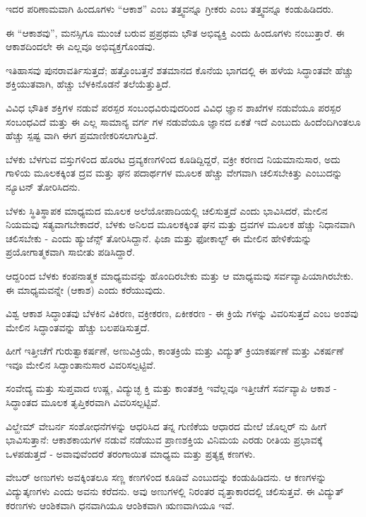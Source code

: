 ಇದರ ಪರಿಣಾಮವಾಗಿ ಹಿಂದೂಗಳು “ಆಕಾಶ” ಎಂಬ ತತ್ತ್ವವನ್ನೂ ಗ್ರೀಕರು  ಎಂಬ ತತ್ತ್ವವನ್ನೂ ಕಂಡುಹಿಡಿದರು.

ಈ “ಆಕಾಶವು”, ಮನಸ್ಸಿಗೂ ಮುಂಚೆ ಬರುವ ಪ್ರಪ್ರಥಮ ಭೌತ ಅಭಿವ್ಯಕ್ತಿ ಎಂದು ಹಿಂದೂಗಳು ನಂಬುತ್ತಾರೆ. ಈ ಆಕಾಶದಿಂದಲೇ ಈ ಎಲ್ಲವೂ ಅಭಿವ್ಯಕ್ತಗೊಂಡವು.

ಇತಿಹಾಸವು ಪುನರಾವರ್ತಿಸುತ್ತದೆ; ಹತ್ತೊಂಬತ್ತನೆ ಶತಮಾನದ ಕೊನೆಯ ಭಾಗದಲ್ಲಿ ಈ ಹಳೆಯ ಸಿದ್ಧಾಂತವೇ ಹೆಚ್ಚು ಶಕ್ತಿಯುತವಾಗಿ, ಹೆಚ್ಚು ಬೆಳಕಿನೊಡನೆ ತಲೆಯೆತ್ತುತ್ತಿದೆ.

ವಿವಿಧ ಭೌತಿಕ ಶಕ್ತಿಗಳ ನಡುವೆ ಪರಸ್ಪರ ಸಂಬಂಧವಿರುವುದರಿಂದ ವಿವಿಧ ಜ್ಞಾನ ಶಾಖೆಗಳ ನಡುವೆಯೂ ಪರಸ್ಪರ ಸಂಬಂಧವಿದೆ ಮತ್ತು ಈ ಎಲ್ಲ ಸಾಮಾನ್ಯ ವರ್ಗ ಗಳ ನಡುವೆಯೂ ಜ್ಞಾನದ ಏಕತೆ ಇದೆ ಎಂಬುದು ಹಿಂದೆಂದಿಗಿಂತಲೂ ಹೆಚ್ಚು ಸ್ಪಷ್ಟ ವಾಗಿ ಈಗ ಪ್ರಮಾಣೀಕರಿಸಲಾಗುತ್ತಿದೆ.

ಬೆಳಕು ಬೆಳಗುವ ವಸ್ತುಗಳಿಂದ ಹೊರಟ ದ್ರವ್ಯಕಣಗಳಿಂದ ಕೂಡಿದ್ದಿದ್ದರೆ, ವಕ್ರೀ ಕರಣದ ನಿಯಮಾನುಸಾರ, ಅದು ಗಾಳಿಯ ಮೂಲಕಕ್ಕಿಂತ ದ್ರವ ಮತ್ತು ಘನ ಪದಾರ್ಥಗಳ ಮೂಲಕ ಹೆಚ್ಚು ವೇಗವಾಗಿ ಚಲಿಸಬೇಕಿತ್ತು ಎಂಬುದನ್ನು ನ್ಯೂಟನ್ ತೋರಿಸಿದನು.

ಬೆಳಕು ಸ್ಥಿತಿಸ್ಥಾಪಕ ಮಾಧ್ಯಮದ ಮೂಲಕ ಅಲೆಯೋಪಾದಿಯಲ್ಲಿ ಚಲಿಸುತ್ತದೆ ಎಂದು ಭಾವಿಸಿದರೆ, ಮೇಲಿನ ನಿಯಮವು ಸತ್ಯವಾಗಬೇಕಾದರೆ, ಬೆಳಕು ಅನಿಲದ ಮೂಲಕಕ್ಕಿಂತ ಘನ ಮತ್ತು ದ್ರವಗಳ ಮೂಲಕ ಹೆಚ್ಚು ನಿಧಾನವಾಗಿ ಚಲಿಸಬೇಕು - ಎಂದು ಹ್ಯುಜೆನ್ಸ್  ತೋರಿಸಿದ್ದಾನೆ. ಫಿಜಾ  ಮತ್ತು ಫೋಕಾಲ್ಟ್  ಈ ಮೇಲಿನ ಹೇಳಿಕೆಯನ್ನು ಪ್ರಯೋಗಾತ್ಮಕವಾಗಿ ಸಾಬೀತು ಪಡಿಸಿದ್ದಾರೆ.

ಆದ್ದರಿಂದ ಬೆಳಕು ಕಂಪನಾತ್ಮಕ ಮಾಧ್ಯಮವನ್ನು ಹೊಂದಿರಬೇಕು ಮತ್ತು ಆ ಮಾಧ್ಯಮವು ಸರ್ವವ್ಯಾಪಿಯಾಗಿರಬೇಕು. ಈ ಮಾಧ್ಯಮವನ್ನೇ  (ಆಕಾಶ) ಎಂದು ಕರೆಯುವುದು.

ವಿಶ್ವ ಆಕಾಶ ಸಿದ್ಧಾಂತವು ಬೆಳಕಿನ ವಿಕಿರಣ, ವಕ್ರೀಕರಣ, ಏಕೀಕರಣ - ಈ ಕ್ರಿಯೆ ಗಳನ್ನು ವಿವರಿಸುತ್ತದೆ ಎಂಬ ಅಂಶವು ಮೇಲಿನ ಸಿದ್ಧಾಂತವನ್ನು ಹೆಚ್ಚು ಬಲಪಡಿಸುತ್ತದೆ.

ಹೀಗೆ ಇತ್ತೀಚೆಗೆ ಗುರುತ್ವಾಕರ್ಷಣೆ, ಅಣುವಿಕ್ರಿಯೆ, ಕಾಂತಕ್ರಿಯೆ ಮತ್ತು ವಿದ್ಯುತ್ ಕ್ರಿಯಾಕರ್ಷಣೆ ಮತ್ತು ವಿಕರ್ಷಣೆ ಇವೂ ಮೇಲಿನ ಸಿದ್ಧಾಂತಾನುಸಾರ ವಿವರಿಸಲ್ಪಟ್ಟಿವೆ.

ಸಂವೇದ್ಯ ಮತ್ತು ಸುಪ್ತವಾದ ಉಷ್ಣ, ವಿದ್ಯುಚ್ಛ ಕ್ತಿ ಮತ್ತು ಕಾಂತಶಕ್ತಿ ಇವೆಲ್ಲವೂ ಇತ್ತೀಚೆಗೆ ಸರ್ವವ್ಯಾಪಿ ಆಕಾಶ - ಸಿದ್ಧಾಂತದ ಮೂಲಕ ತೃಪ್ತಿಕರವಾಗಿ ವಿವರಿಸಲ್ಪಟ್ಟಿವೆ.

ವಿಲ್ಹೇಮ್​ ವೇಬರ್ನ ಸಂಶೋಧನೆಗಳನ್ನು ಆಧರಿಸಿದ ತನ್ನ ಗುಣಿಕೆಯ ಆಧಾರದ ಮೇಲೆ ಜೊಲ್ನರ್  ನು ಹೀಗೆ ಭಾವಿಸುತ್ತಾನೆ: ಆಕಾಶಕಾಯಗಳ ನಡುವೆ ನಡೆಯುವ ಪ್ರಾಣಶಕ್ತಿಯ ವಿನಿಮಯ ಎರಡು ರೀತಿಯ ಪ್ರಭಾವಕ್ಕೆ ಒಳಪಡುತ್ತದೆ - ಅವಾವುವೆಂದರೆ ತರಂಗಾಯಿತ ಮಾಧ್ಯಮ ಮತ್ತು ಪ್ರತ್ಯಕ್ಷ ಕಣಗಳು.

ವೇಬರ್ ಅಣುಗಳು  ಅವಕ್ಕಿಂತಲೂ ಸಣ್ಣ ಕಣಗಳಿಂದ ಕೂಡಿವೆ ಎಂಬುದನ್ನು ಕಂಡುಹಿಡಿದನು. ಆ ಕಣಗಳನ್ನು ವಿದ್ಯುತ್ಕಣಗಳು ಎಂದು ಅವನು ಕರೆದನು. ಅವು ಅಣುಗಳಲ್ಲಿ ನಿರಂತರ ವೃತ್ತಾಕಾರದಲ್ಲಿ ಚಲಿಸುತ್ತವೆ. ಈ ವಿದ್ಯುತ್ ಕರಣಗಳು ಆಂಶಿಕವಾಗಿ ಧನವಾಗಿಯೂ ಆಂಶಿಕವಾಗಿ ಋಣವಾಗಿಯೂ ಇವೆ.


